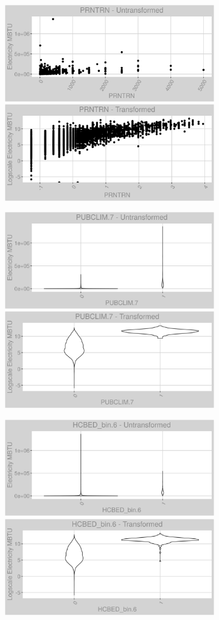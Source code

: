 \begin{figure}
\centering
\begin{subfigure}{1\textwidth}
\centering
\includegraphics[width=.49\textwidth, height=0.3\textheight]{Images/electricity_var_original_0.png}
\includegraphics[width=.49\textwidth, height=0.3\textheight]{Images/electricity_var_transformed_0.png}
\centering
\end{subfigure}
\begin{subfigure}{1\textwidth}
\centering
\includegraphics[width=.49\textwidth, height=0.3\textheight]{Images/electricity_var_original_1.png}
\includegraphics[width=.49\textwidth, height=0.3\textheight]{Images/electricity_var_transformed_1.png}
\end{subfigure}
\begin{subfigure}{1\textwidth}
\centering
\includegraphics[width=.49\textwidth, height=0.3\textheight]{Images/electricity_var_original_2.png}
\includegraphics[width=.49\textwidth, height=0.3\textheight]{Images/electricity_var_transformed_2.png}
\end{subfigure}
\end{figure}
